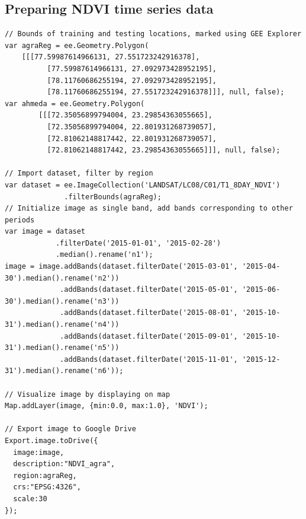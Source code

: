 \documentclass[12pt, a4paper]{report}
\begin{document}
\subsection*{Preparing NDVI time series data}
\begin{verbatim}
// Bounds of training and testing locations, marked using GEE Explorer
var agraReg = ee.Geometry.Polygon(
	[[[77.59987614966131, 27.551723242916378],
          [77.59987614966131, 27.092973428952195],
          [78.11760686255194, 27.092973428952195],
          [78.11760686255194, 27.551723242916378]]], null, false);
var ahmeda = ee.Geometry.Polygon(
        [[[72.35056899794004, 23.29854363055665],
          [72.35056899794004, 22.801931268739057],
          [72.81062148817442, 22.801931268739057],
          [72.81062148817442, 23.29854363055665]]], null, false);

// Import dataset, filter by region
var dataset = ee.ImageCollection('LANDSAT/LC08/C01/T1_8DAY_NDVI')
              .filterBounds(agraReg);
// Initialize image as single band, add bands corresponding to other periods
var image = dataset
            .filterDate('2015-01-01', '2015-02-28')
            .median().rename('n1');
image = image.addBands(dataset.filterDate('2015-03-01', '2015-04-30').median().rename('n2'))
             .addBands(dataset.filterDate('2015-05-01', '2015-06-30').median().rename('n3'))
             .addBands(dataset.filterDate('2015-08-01', '2015-10-31').median().rename('n4'))
             .addBands(dataset.filterDate('2015-09-01', '2015-10-31').median().rename('n5'))
             .addBands(dataset.filterDate('2015-11-01', '2015-12-31').median().rename('n6'));

// Visualize image by displaying on map
Map.addLayer(image, {min:0.0, max:1.0}, 'NDVI');

// Export image to Google Drive
Export.image.toDrive({
  image:image,
  description:"NDVI_agra",
  region:agraReg,
  crs:"EPSG:4326",
  scale:30
});
\end{verbatim}
\end{document}
